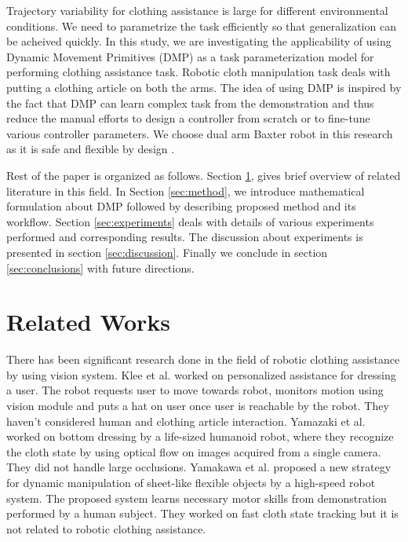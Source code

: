 \documentclass[sigconf]{acmart}
\begin{document}
Trajectory variability for clothing assistance is large for different environmental conditions. We need to parametrize the task efficiently so that generalization can be acheived quickly. In this study, we are investigating the applicability of using Dynamic Movement Primitives (DMP) as a task parameterization model for performing clothing assistance task. Robotic cloth manipulation task deals with putting a clothing article on both the arms. The idea of using DMP is inspired by the fact that DMP can learn complex task from the demonstration \cite{ijspeert2003learning, schaal2006dynamic, ijspeert2013dynamical} and thus reduce the manual efforts to design a controller from scratch or to fine-tune various controller parameters. We choose dual arm Baxter robot in this research as it is safe and flexible by design \cite{fitzgerald2013developing}. 

Rest of the paper is organized as follows. Section \ref{sec:related_works}, gives brief overview of related literature in this field. In Section \ref{sec:method}, we introduce mathematical formulation about DMP followed by describing proposed method and its workflow. Section \ref{sec:experiments} deals with details of various experiments performed and corresponding results. The discussion about experiments is presented in section \ref{sec:discussion}. Finally we conclude in section \ref{sec:conclusions} with future directions.

\section{Related Works}
\label{sec:related_works}
There has been significant research done in the field of robotic clothing assistance by using vision system. Klee et al. \cite{klee2015personalized} worked on personalized assistance for dressing a user. The robot requests user to move towards robot, monitors motion using vision module and puts a hat on user once user is reachable by the robot. They haven't considered human and clothing article interaction. Yamazaki et al. \cite{yamazaki2013method, yamazaki2014bottom}  worked on bottom dressing by a life-sized humanoid robot, where they recognize the cloth state by using optical flow on images acquired from a single camera. They did not handle large occlusions. Yamakawa et al. \cite{yamakawa2011dynamic} proposed a new strategy for dynamic manipulation of sheet-like flexible objects by a high-speed robot system. The proposed system learns necessary motor skills from demonstration performed by a human subject. They worked on fast cloth state tracking but it is not related to robotic clothing assistance.
\end{document}
